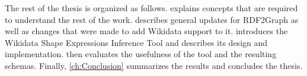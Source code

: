 The rest of the thesis %
is organized as follows.
 explains concepts that are required
to understand the rest of the work. %
 describes general updates for RDF2Graph
as well as changes that were made to add Wikidata support to it.
 introduces the Wikidata Shape Expressions Inference Tool
and describes its design and implementation.
 then evaluates the usefulness of the tool and the resulting schemas.
Finally, \cref{ch:Conclusion} summarizes the results and concludes the thesis.
